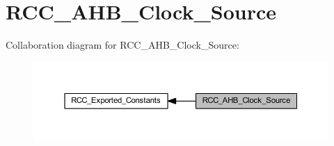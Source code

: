 \hypertarget{group___r_c_c___a_h_b___clock___source}{}\section{R\+C\+C\+\_\+\+A\+H\+B\+\_\+\+Clock\+\_\+\+Source}
\label{group___r_c_c___a_h_b___clock___source}
Collaboration diagram for R\+C\+C\+\_\+\+A\+H\+B\+\_\+\+Clock\+\_\+\+Source\+:\nopagebreak
\begin{figure}[H]
\begin{center}
\leavevmode
\includegraphics[width=350pt]{group___r_c_c___a_h_b___clock___source}
\end{center}
\end{figure}
